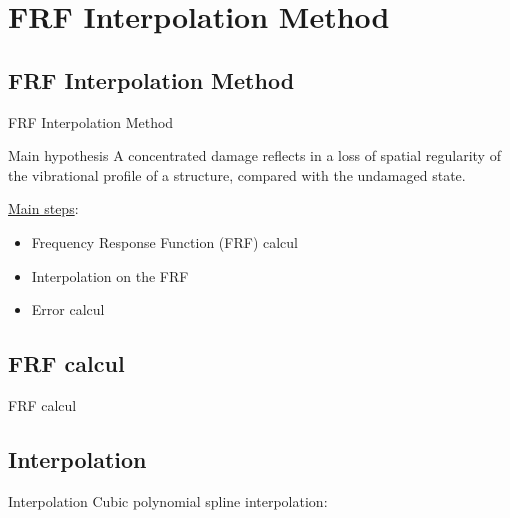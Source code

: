 \documentclass{beamer}
\begin{document}
\section{FRF Interpolation Method}

\subsection{FRF Interpolation Method}
\begin{frame}{FRF Interpolation Method}

\begin{alertblock}{Main hypothesis}
A concentrated damage reflects
in a loss of spatial regularity of the vibrational profile of a
structure, compared with the undamaged state.
\end{alertblock}


\underline{Main steps}:
\begin{itemize}
\item Frequency Response Function (FRF) calcul
\item Interpolation on the FRF
\item Error calcul
\end{itemize}


\end{frame}


\subsection{FRF calcul}
\begin{frame}{FRF calcul}
\end{frame}

\subsection{Interpolation}
\begin{frame}{Interpolation}
Cubic polynomial spline interpolation:



\end{frame}
\end{document}
